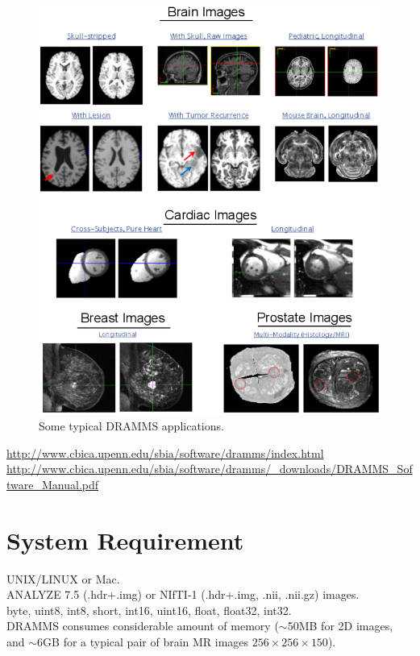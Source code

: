 \documentclass[a4paper,12pt]{article}
\begin{document}
\begin{figure}[ht!]
	\centering
	\includegraphics[width=15cm]{AllExamples.png}
	\caption{Some typical DRAMMS applications.}
	\label{fig:DRAMMSApplications}
\end{figure}

 \url{http://www.cbica.upenn.edu/sbia/software/dramms/index.html} \\
 \url{http://www.cbica.upenn.edu/sbia/software/dramms/_downloads/DRAMMS_Software_Manual.pdf} 



\section{System Requirement}  
\label{System}  

 UNIX/LINUX or Mac. \\
 ANALYZE 7.5 (.hdr+.img) or NIfTI-1 (.hdr+.img, .nii, .nii.gz) images. \\
 byte, uint8, int8, short, int16, uint16, float, float32, int32. \\
 DRAMMS consumes considerable amount of memory ($\sim$50MB for 2D images, and $\sim$6GB for a typical pair of brain MR images $256\times256\times150$). \\
\end{document}

